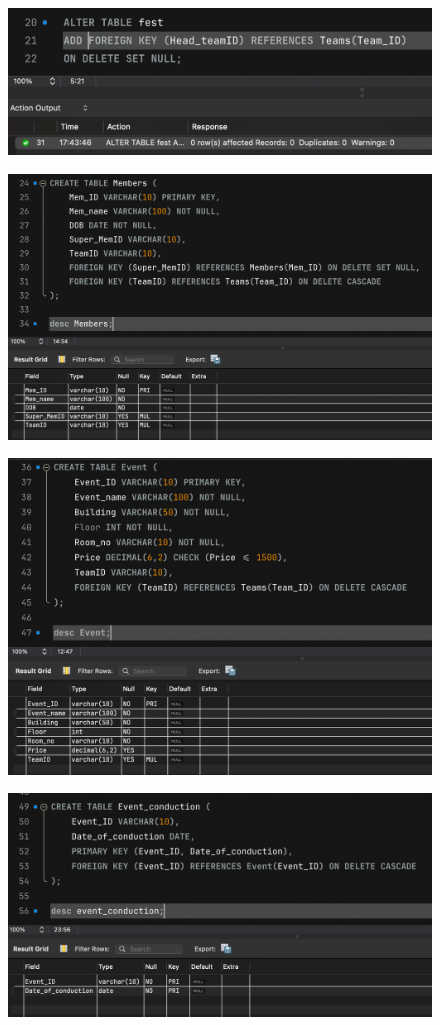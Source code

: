 \documentclass{article}
\begin{document}
\begin{figure}[H]
    \centering
    \includegraphics[width=0.7\linewidth]{images/task 1/3.png}
\end{figure}

\begin{figure}[H]
    \centering
    \includegraphics[width=0.7\linewidth]{images/task 1/4.png}
\end{figure}

\begin{figure}[H]
    \centering
    \includegraphics[width=0.7\linewidth]{images/task 1/5.png}
\end{figure}

\begin{figure}[H]
    \centering
    \includegraphics[width=0.7\linewidth]{images/task 1/6.png}
\end{figure}
\end{document}
